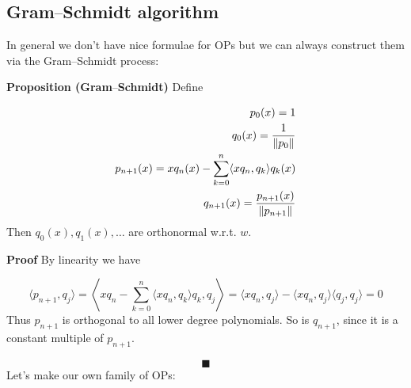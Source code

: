\documentclass[12pt,a4paper]{article}
\def\endash{–}
\begin{document}
\subsection{Gram\ensuremath{\endash}Schmidt algorithm}
In general we don't have nice formulae for OPs but we can always construct them via the Gram\ensuremath{\endash}Schmidt process:

\textbf{Proposition (Gram\ensuremath{\endash}Schmidt)} Define


\begin{align*}
p_0(x) = 1 \\
q_0(x) = {1 \over \|p_0\|}\\
p_{n+1}(x) = x q_n(x) - \sum_{k=0}^n \langle x q_n, q_k\rangle q_k(x)\\
q_{n+1}(x) = {p_{n+1}(x) \over \|p_{n+1}\|}
\end{align*}
Then $q_0(x), q_1(x), \ldots$ are orthonormal w.r.t. $w$.

\textbf{Proof} By linearity we have

\[
\langle p_{n+1}, q_j\rangle = \left\langle x q_n - \sum_{k=0}^n {\langle x q_n, q_k\rangle} q_k, q_j\right\rangle = \langle x q_n, q_j\rangle - \langle x q_n, q_j\rangle \langle q_j,q_j\rangle = 0
\]
Thus $p_{n+1}$ is orthogonal to all lower degree polynomials. So is $q_{n+1}$, since it is a constant multiple of $p_{n+1}$.

\[
\blacksquare
\]
Let's make our own family of OPs:
\end{document}
